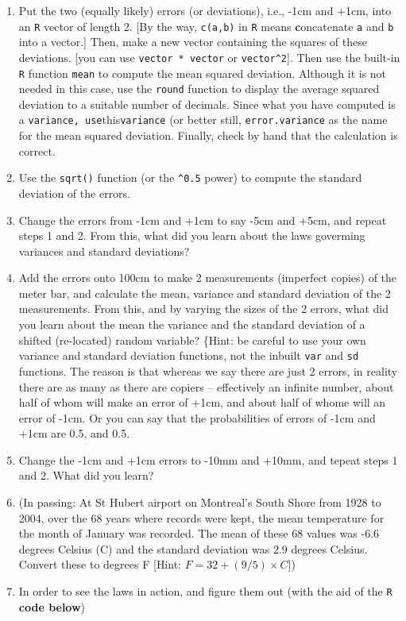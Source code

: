 \documentclass[]{book}
\begin{document}
\begin{enumerate}
\def\labelenumi{\arabic{enumi}.}
\item
  Put the two (equally likely) errors (or deviations), i.e., -1cm and +1cm, into an \texttt{R} vector of length 2. {[}By the way, \texttt{c(a,b)} in \texttt{R} means \textbf{c}oncatenate \texttt{a} and \texttt{b} into a vector.{]} Then, make a new vector containing the squares of these deviations. {[}you can use \texttt{vector\ *\ vector} or \texttt{vector\^{}2}{]}. Then use the built-in \texttt{R} function \texttt{mean} to compute the mean squared deviation. Although it is not needed in this case, use the \texttt{round} function to display the average squared deviation to a suitable number of decimals. Since what you have computed is a \texttt{variance\textquotesingle{},\ use}this\texttt{variance} (or better still, \texttt{error.variance} as the name for the mean squared deviation. Finally, check by hand that the calculation is correct.
\item
  Use the \texttt{sqrt()} function (or the \texttt{\^{}0.5} power) to compute the standard deviation of the errors.
\item
  Change the errors from -1cm and +1cm to say -5cm and +5cm, and repeat steps 1 and 2. From this, what did you learn about the laws goverming variances and standard deviations?
\item
  Add the errors onto 100cm to make 2 measurements (imperfect copies) of the meter bar, and calculate the mean, variance and standard deviation of the 2 measurements. From this, and by varying the sizes of the 2 errors, what did you learn about the mean the variance and the standard deviation of a shifted (re-located) random variable? \{Hint: be careful to use your own variance and standard deviation functions, not the inbuilt \texttt{var} and \texttt{sd} functions. The reason is that whereas we say there are just 2 errors, in reality there are as many as there are copiers -- effectively an infinite number, about half of whom will make an error of +1cm, and about half of whome will an error of -1cm. Or you can say that the probabilities of errors of -1cm and +1cm are 0.5, and 0.5.
\item
  Change the -1cm and +1cm errors to -10mm and +10mm, and tepeat steps 1 and 2. What did you learn?
\item
  (In passing: At St Hubert airport on Montreal's South Shore from 1928 to 2004, over the 68 years where records were kept, the mean temperature for the month of January was recorded. The mean of these 68 values was -6.6 degrees Celsius (C) and the standard deviation was 2.9 degrees Celsius. Convert these to degrees F {[}Hint: \(F = 32 + (9/5) \times C\){]})
\item
  In order to see the laws in action, and figure them out (with the aid of the \texttt{R} \textbf{code below})


\end{enumerate}
\end{document}
